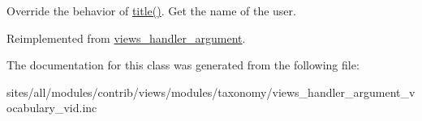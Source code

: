 Override the behavior of \hyperlink{classviews__handler__argument__vocabulary__vid_f932cd38cbab2252261bcb077f2d9bd7}{title()}. Get the name of the user. 

Reimplemented from \hyperlink{classviews__handler__argument_76181ac24e7be4a09aaafc1fa5f15ea1}{views\_\-handler\_\-argument}.

The documentation for this class was generated from the following file:\begin{CompactItemize}
\item 
sites/all/modules/contrib/views/modules/taxonomy/views\_\-handler\_\-argument\_\-vocabulary\_\-vid.inc\end{CompactItemize}
